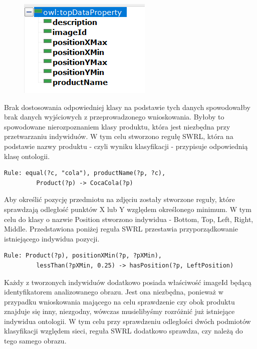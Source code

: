 \begin{itemize}
\begin{figure}
	\centering
	\includegraphics[width=0.7\linewidth]{images/dataproperties}
	\caption[Zbiór wszystkich właściwości istniejących obiektów]{}
	\label{fig:dataproperties}
\end{figure}



Brak dostosowania odpowiedniej klasy na podstawie tych danych spowodowałby brak danych wyjściowych z przeprowadzonego wnioskowania. Byłoby to spowodowane nierozpoznaniem klasy produktu, która jest niezbędna przy przetwarzaniu indywiduów. W tym celu stworzono regułę SWRL, która na podstawie nazwy produktu - czyli wyniku klasyfikacji - przypisuje odpowiednią klasę ontologii. 

\begin{lstlisting}[caption={Przypisanie klasy do indywiduum.}]
 Rule: equal(?c, "cola"), productName(?p, ?c), 
		 Product(?p) -> CocaCola(?p)
\end{lstlisting}

Aby określić pozycję przedmiotu na zdjęciu zostały stworzone reguły, które sprawdzają odległość punktów X lub Y względem określonego minimum. W tym celu do klasy o nazwie Position stworzono indywidua - Bottom, Top, Left, Right, Middle. Przedstawiona poniżej reguła SWRL przestawia przyporządkowanie istniejącego indywidua pozycji.

\begin{lstlisting}[caption={Przypisanie pozycji LeftPosition do indywidua na podstawie właściwości XMin.}]
Rule: Product(?p), positionXMin(?p, ?pXMin), 
		 lessThan(?pXMin, 0.25) -> hasPosition(?p, LeftPosition)
\end{lstlisting}

Każdy z tworzonych indywiduów dodatkowo posiada właściwość imageId będącą identyfikatorem analizowanego obrazu. Jest ona niezbędna, ponieważ w przypadku wnioskowania mającego na celu sprawdzenie czy obok produktu znajduje się inny, niezgodny, wówczas musielibyśmy rozróżnić już istniejące indywidua ontologii. W tym celu przy sprawdzeniu odległości dwóch podmiotów klasyfikacji względem sieci, reguła SWRL dodatkowo sprawdza, czy należą do tego samego obrazu.


\end{itemize}
